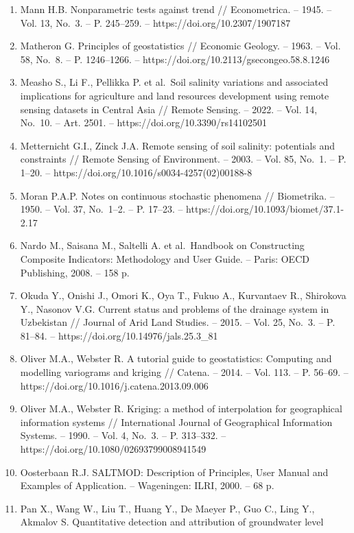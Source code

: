 \documentclass[14pt,a4paper,oneside]{extreport}
\begin{document}
\begin{enumerate}
\item
  Mann H.B. Nonparametric tests against trend // Econometrica. -- 1945.
  -- Vol. 13, No.~3. -- P. 245--259. -- https://doi.org/10.2307/1907187
\item
  Matheron G. Principles of geostatistics // Economic Geology. -- 1963.
  -- Vol. 58, No.~8. -- P. 1246--1266. --
  https://doi.org/10.2113/gsecongeo.58.8.1246
\item
  Measho S., Li F., Pellikka P. et al.~Soil salinity variations and
  associated implications for agriculture and land resources development
  using remote sensing datasets in Central Asia // Remote Sensing. --
  2022. -- Vol. 14, No.~10. -- Art. 2501. --
  https://doi.org/10.3390/rs14102501
\item
  Metternicht G.I., Zinck J.A. Remote sensing of soil salinity:
  potentials and constraints // Remote Sensing of Environment. -- 2003.
  -- Vol. 85, No.~1. -- P. 1--20. --
  https://doi.org/10.1016/s0034-4257(02)00188-8
\item
  Moran P.A.P. Notes on continuous stochastic phenomena // Biometrika.
  -- 1950. -- Vol. 37, No.~1--2. -- P. 17--23. --
  https://doi.org/10.1093/biomet/37.1-2.17
\item
  Nardo M., Saisana M., Saltelli A. et al.~Handbook on Constructing
  Composite Indicators: Methodology and User Guide. -- Paris: OECD
  Publishing, 2008. -- 158 p.
\item
  Okuda Y., Onishi J., Omori K., Oya T., Fukuo A., Kurvantaev R.,
  Shirokova Y., Nasonov V.G. Current status and problems of the drainage
  system in Uzbekistan // Journal of Arid Land Studies. -- 2015. -- Vol.
  25, No.~3. -- P. 81--84. -- https://doi.org/10.14976/jals.25.3\_81
\item
  Oliver M.A., Webster R. A tutorial guide to geostatistics: Computing
  and modelling variograms and kriging // Catena. -- 2014. -- Vol. 113.
  -- P. 56--69. -- https://doi.org/10.1016/j.catena.2013.09.006
\item
  Oliver M.A., Webster R. Kriging: a method of interpolation for
  geographical information systems // International Journal of
  Geographical Information Systems. -- 1990. -- Vol. 4, No.~3. -- P.
  313--332. -- https://doi.org/10.1080/02693799008941549
\item
  Oosterbaan R.J. SALTMOD: Description of Principles, User Manual and
  Examples of Application. -- Wageningen: ILRI, 2000. -- 68 p.
\item
  Pan X., Wang W., Liu T., Huang Y., De Maeyer P., Guo C., Ling Y.,
  Akmalov S. Quantitative detection and attribution of groundwater level

\end{enumerate}
\end{document}
